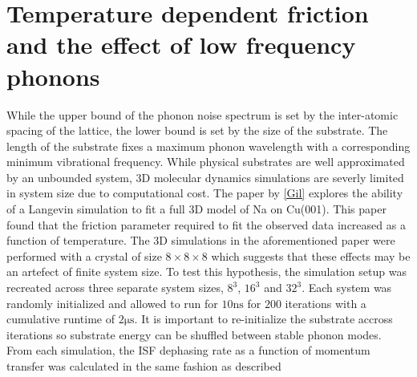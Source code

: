 \documentclass{article}
\newcommand{\ns}{\si{\nano\second}}
\newcommand{\us}{\si{\micro\second}}
\begin{document}
\section{Temperature dependent friction and the effect of low frequency phonons}

While the upper bound of the phonon noise spectrum is set by the inter-atomic spacing of the lattice, the lower bound is set by the size of the substrate. The length of the substrate fixes a maximum phonon wavelength with a corresponding minimum vibrational frequency. While physical substrates are well approximated by an unbounded system, 3D molecular dynamics simulations are severly limited in system size due to computational cost. The paper by \ref{Gil} explores the ability of a Langevin simulation to fit a full 3D model of Na on Cu(001). This paper found that the friction parameter required to fit the observed data increased as a function of temperature. The 3D simulations in the aforementioned paper were performed with a crystal of size $8\times8\times8$ which suggests that these effects may be an artefect of finite system size. To test this hypothesis, the simulation setup was recreated across three separate system sizes, $8^3$, $16^3$ and $32^3$. Each system was randomly initialized and allowed to run for $10\ns$ for $200$ iterations with a cumulative runtime of $2\us$. It is important to re-initialize the substrate accross iterations so substrate energy can be shuffled between stable phonon modes. From each simulation, the ISF dephasing rate as a function of momentum transfer was calculated in the same fashion as described  
\end{document}
